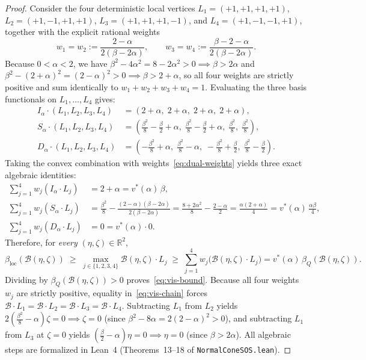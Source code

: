 \documentclass[11pt,a4paper]{article}
\newcommand{\RR}{\mathbb{R}}
\newcommand{\calB}{\mathcal{B}}
\begin{document}
\begin{proof}
Consider the four deterministic local vertices $L_1 = (+1,+1,+1,+1)$, $L_2 = (+1,-1,+1,+1)$, $L_3 = (+1,+1,+1,-1)$, and $L_4 = (+1,-1,-1,+1)$, together with the explicit rational weights
\begin{equation}
  w_1 = w_2 := \frac{2-\alpha}{2(\beta - 2\alpha)}, \qquad
  w_3 = w_4 := \frac{\beta - 2 - \alpha}{2(\beta - 2\alpha)}.
  \label{eq:dual-weights}
\end{equation}
Because $0 < \alpha < 2$, we have $\beta^2 - 4\alpha^2 = 8 - 2\alpha^2 > 0 \implies \beta > 2\alpha$ and $\beta^2 - (2+\alpha)^2 = (2-\alpha)^2 > 0 \implies \beta > 2+\alpha$, so all four weights are strictly positive and sum identically to $w_1 + w_2 + w_3 + w_4 = 1$.
Evaluating the three basis functionals on $L_1, \dots, L_4$ gives:
\begin{align}
  I_\alpha \cdot (L_1, L_2, L_3, L_4) &= (2+\alpha,\; 2+\alpha,\; 2+\alpha,\; 2+\alpha),\\
  S_\alpha \cdot (L_1, L_2, L_3, L_4) &= \left(\tfrac{\beta^2}{8} - \tfrac{\beta}{2} + \alpha,\; \tfrac{\beta^2}{8} - \tfrac{\beta}{2} + \alpha,\; \tfrac{\beta^2}{8},\; \tfrac{\beta^2}{8}\right),\\
  D_\alpha \cdot (L_1, L_2, L_3, L_4) &= \left(-\tfrac{\beta^2}{8}+\alpha,\; \tfrac{\beta^2}{8}-\alpha,\; -\tfrac{\beta^2}{8}+\tfrac{\beta}{2},\; \tfrac{\beta^2}{8}-\tfrac{\beta}{2}\right).
\end{align}
Taking the convex combination with weights~\eqref{eq:dual-weights} yields three exact algebraic identities:
\begin{align}
  \sum_{j=1}^4 w_j (I_\alpha \cdot L_j) &= 2 + \alpha = v^*(\alpha)\,\beta,\\
  \sum_{j=1}^4 w_j (S_\alpha \cdot L_j) &= \frac{\beta^2}{8} - \frac{(2-\alpha)(\beta - 2\alpha)}{2(\beta - 2\alpha)} = \frac{8+2\alpha^2}{8} - \frac{2-\alpha}{2} = \frac{\alpha(2+\alpha)}{4} = v^*(\alpha)\,\frac{\alpha\beta}{4},\\
  \sum_{j=1}^4 w_j (D_\alpha \cdot L_j) &= 0 = v^*(\alpha)\cdot 0.
\end{align}
Therefore, for \emph{every} $(\eta,\zeta) \in \RR^2$,
\begin{equation}
  \beta_{\mathrm{loc}}(\calB(\eta,\zeta)) \;\ge\; \max_{j \in \{1,2,3,4\}} \calB(\eta,\zeta)\cdot L_j \;\ge\; \sum_{j=1}^4 w_j \bigl(\calB(\eta,\zeta)\cdot L_j\bigr) = v^*(\alpha)\,\beta_Q(\calB(\eta,\zeta)).
  \label{eq:vis-chain}
\end{equation}
Dividing by $\beta_Q(\calB(\eta,\zeta)) > 0$ proves~\eqref{eq:vis-bound}.
Because all four weights $w_j$ are strictly positive, equality in~\eqref{eq:vis-chain} forces $\calB\cdot L_1 = \calB\cdot L_2 = \calB\cdot L_3 = \calB\cdot L_4$. Subtracting $L_1$ from $L_2$ yields $2(\frac{\beta^2}{8}-\alpha)\zeta = 0 \implies \zeta = 0$ (since $\beta^2 - 8\alpha = 2(2-\alpha)^2 > 0$), and subtracting $L_1$ from $L_3$ at $\zeta = 0$ yields $(\frac{\beta}{2}-\alpha)\eta = 0 \implies \eta = 0$ (since $\beta > 2\alpha$).
All algebraic steps are formalized in Lean~4 (Theorems~13--18 of \texttt{NormalConeSOS.lean}).
\end{proof}
\end{document}
